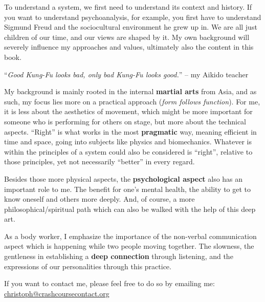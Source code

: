 To understand a system, we first need to understand its context and history.
If you want to understand psychoanalysis, for example, you first have to understand Sigmund Freud and the sociocultural environment he grew up in.
We are all just children of our time, and our views are shaped by it.
My own background will severely influence my approaches and values, ultimately also the content in this book.

\begin{displayquote}
    ``\textit{Good Kung-Fu looks bad, only bad Kung-Fu looks good.}'' -- my Aikido teacher
\end{displayquote}

My background is mainly rooted in the internal \textbf{martial arts} from Asia, and as such, my focus lies more on a practical approach (\textit{form follows function}).
For me, it is less about the aesthetics of movement, which might be more important for someone who is performing for others on stage, but more about the technical aspects.
``Right'' is what works in the most \textbf{pragmatic} way, meaning efficient in time and space, going into subjects like physics and biomechanics.
Whatever is within the principles of a system could also be considered is ``right'', relative to those principles, yet not necessarily ``better'' in every regard.

Besides those more physical aspects, the \textbf{psychological aspect} also has an important role to me.
The benefit for one's mental health, the ability to get to know oneself and others more deeply.
And, of course, a more philosophical/spiritual path which can also be walked with the help of this deep art.

As a body worker, I emphasize the importance of the non-verbal communication aspect which is happening while two people moving together.
The slowness, the gentleness in establishing a \textbf{deep connection} through listening, and the expressions of our personalities through this practice.

If you want to contact me, please feel free to do so by emailing me: \href{mailto:christoph@crashcoursecontact.org}{christoph@crashcoursecontact.org}
